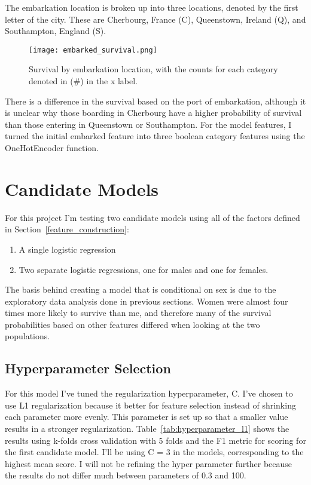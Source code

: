 \documentclass[12pt, letterpaper]{article}
\begin{document}
The embarkation location is broken up into three locations, denoted by the first letter of the city. These are Cherbourg, France (C), Queenstown, Ireland (Q), and Southampton, England (S).

\begin{figure}[H]
    \centering
    \texttt{[image: embarked\_survival.png]}
    \caption{Survival by embarkation location, with the counts for each category denoted in (\#) in the x label. }
    \label{fig:embarked_prob}
\end{figure}

There is a difference in the survival based on the port of embarkation, although it is unclear why those boarding in Cherbourg have a higher probability of survival than those entering in Queenstown or Southampton. For the model features, I turned the initial embarked feature into three boolean category features using the OneHotEncoder function.

\section{Candidate Models}

For this project I'm testing two candidate models using all of the factors defined in Section~\ref{feature_construction}:

\begin{enumerate}
	\item A single logistic regression
	\item Two separate logistic regressions, one for males and one for females.
\end{enumerate}

The basis behind creating a model that is conditional on sex is due to the exploratory data analysis done in previous sections. Women were almost four times more likely to survive than me, and therefore many of the survival probabilities based on other features differed when looking at the two populations.

\subsection{Hyperparameter Selection}

For this model I've tuned the regularization hyperparameter, C. I've chosen to use L1 regularization because it better for feature selection instead of shrinking each parameter more evenly. This parameter is set up so that a smaller value results in a stronger regularization. Table~\ref{tab:hyperparameter_l1} shows the results using k-folds cross validation with 5 folds and the F1 metric for scoring for the first candidate model. I'll be using C = 3 in the models, corresponding to the highest mean score. I will not be refining the hyper parameter further because the results do not differ much between parameters of 0.3 and 100.
\end{document}
